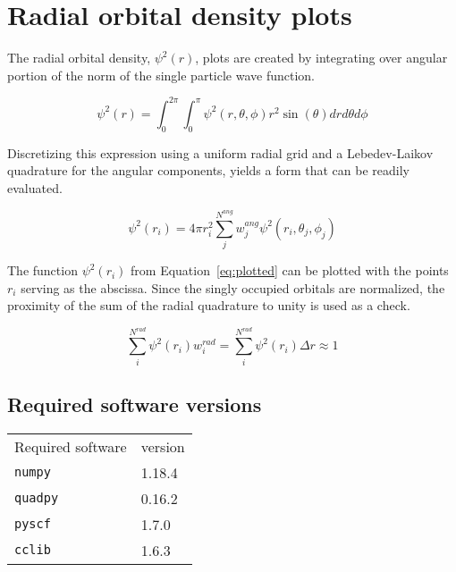 \section{Radial orbital density plots}
The radial orbital density, ${\psi}^2(r)$, plots are created by integrating over angular portion of the norm of the single particle wave function.

\begin{equation}
    {\psi}^2(r) = \int_0^{2\pi}\int_0^{\pi} \psi^2(r,\theta,\phi) r^2 \sin(\theta) dr d\theta d\phi
\end{equation}

Discretizing this expression using a uniform radial grid and a Lebedev-Laikov quadrature for the angular components, yields a form that can be readily evaluated.

\begin{equation}\label{eq:plotted}
    {\psi}^2(r_i) = 4 \pi {r_i^2}  \sum_j^{N^{ang}} w^{ang}_j \psi^2(r_i,\theta_j,\phi_j) 
\end{equation}

The function ${\psi}^2(r_i)$ from Equation~\ref{eq:plotted} can be plotted with the points $r_i$ serving as the abscissa.
Since the singly occupied orbitals are normalized, the proximity of the sum of the radial quadrature to unity is used as a check.

\begin{equation}\label{eq:norm}
    \sum_i^{N^{rad}} {\psi}^2(r_i) w^{rad}_i = \sum_i^{N^{rad}} {\psi}^2(r_i) {\Delta}r \approx  1
\end{equation}

\subsection{Required software versions}
\begin{table}[H]
\begin{tabular}{ll}
Required software      & version     \\
\texttt{numpy}  & 1.18.4      \\
\texttt{quadpy} & 0.16.2      \\
\texttt{pyscf}  & 1.7.0       \\
\texttt{cclib}  & 1.6.3       \\
\end{tabular}   
\end{table}


